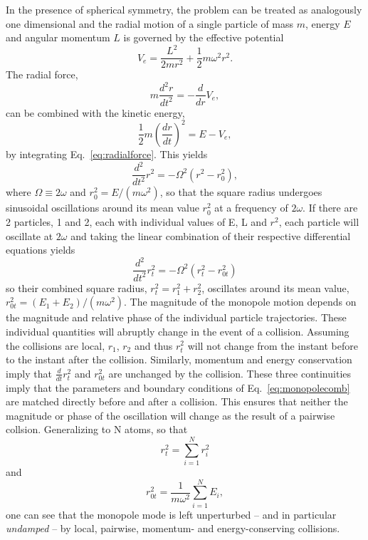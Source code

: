 \documentclass[%
 reprint,
 amsmath,amssymb,
 aps,
]{revtex4-1}
\begin{document}
In the presence of spherical symmetry, the problem can be treated as analogously one dimensional and the radial motion of a single particle of mass $m$, energy $E$ and angular momentum $L$ is governed by the effective potential
\begin{equation}
V_e = \frac{L^2}{2mr^2}+\frac{1}{2}m\omega^2r^2.
\end{equation}
The radial force,
\begin{equation}
m\frac{d^2r}{dt^2} = -\frac{d}{dr}V_e,
\label{eq:radialforce}
\end{equation}
can be combined with the kinetic energy,
\begin{equation}
\frac{1}{2}m\left(\frac{dr}{dt}\right)^2 = E-V_e,
\end{equation}
by integrating Eq.~\ref{eq:radialforce}. This yields
\begin{equation}
\frac{d^2}{dt^2}r^2 = -\Omega^2\left(r^2-r_0^2\right),
\end{equation}
where $\Omega\equiv2\omega$ and $r_0^2=E/(m\omega^2)$, so that the square radius undergoes sinusoidal oscillations around its mean value $r_0^2$ at a frequency of $2\omega$. If there are 2 particles, 1 and 2, each with individual values of E, L and $r^2$, each particle will oscillate at $2\omega$ and taking the linear combination of their respective differential equations yields
\begin{equation}
\frac{d^2}{dt^2}r_t^2 = -\Omega^2\left(r_t^2-r_{0t}^2\right)
\label{eq:monopolecomb}
\end{equation}
so their combined square radius, $r_t^2 = r_1^2+r_2^2$, oscillates around its mean value, $r_{0t}^2 = (E_1+E_2)/(m\omega^2)$. The magnitude of the monopole motion depends on the magnitude and relative phase of the individual particle trajectories. These individual quantities will abruptly change in the event of a collision. Assuming the collisions are local, $r_1$, $r_2$ and thus $r_t^2$ will not change from the instant before to the instant after the collision. Similarly, momentum and energy conservation imply that $\frac{d}{dt}r_t^2$ and $r_{0t}^2$ are unchanged by the collision. These three continuities imply that the parameters and boundary conditions of Eq.~\ref{eq:monopolecomb} are matched directly before and after a collision. This ensures that neither the magnitude or phase of the oscillation will change as the result of a pairwise collsion. Generalizing to N atoms, so that
\begin{equation}
r_t^2 = \sum_{i=1}^Nr_i^2
\end{equation}
and
\begin{equation}
r_{0t}^2 = \frac{1}{m\omega^2}\sum_{i=1}^NE_i,
\end{equation}
one can see that the monopole mode is left unperturbed -- and in particular \textit{undamped} -- by local, pairwise, momentum- and energy-conserving collisions.
\end{document}
